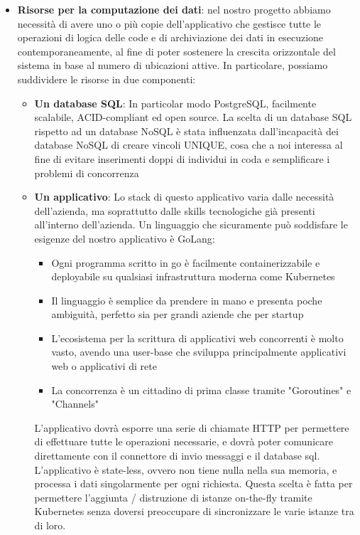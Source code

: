 \documentclass[a4paper, titlepage, 12pt, openright, twoside]{book}
\begin{document}
\begin{itemize}
	\item \textbf{Risorse per la computazione dei dati}: nel nostro progetto abbiamo necessità di avere uno o più copie dell'applicativo che gestisce tutte le operazioni
				 di logica delle code e di archiviazione dei dati in esecuzione contemporaneamente, al fine di poter sostenere la crescita orizzontale del sistema in base al numero di ubicazioni attive. In particolare, possiamo suddividere le risorse in due componenti:
				 \begin{itemize}
				 	\item \textbf{Un database SQL}: In particolar modo PostgreSQL, facilmente scalabile, ACID-compliant ed open source. La scelta di un database SQL rispetto ad
				 				 un database NoSQL è stata influenzata dall'incapacità dei database NoSQL di creare vincoli UNIQUE, cosa che a noi interessa
				 				 al fine di evitare inserimenti doppi di individui in coda e semplificare i problemi di concorrenza
				 	\item \textbf{Un applicativo}: Lo stack di questo applicativo varia dalle necessità dell'azienda, ma soprattutto dalle skills tecnologiche già presenti
				 				 all'interno dell'azienda. Un linguaggio che sicuramente può soddisfare le esigenze del nostro applicativo è GoLang:
				 				 \begin{itemize}
				 				 	\item Ogni programma scritto in go è facilmente containerizzabile e deployabile su qualsiasi infrastruttura moderna come Kubernetes
				 				 	\item Il linguaggio è semplice da prendere in mano e presenta poche ambiguità, perfetto sia per grandi aziende che per startup
				 				 	\item L'ecosistema per la scrittura di applicativi web concorrenti è molto vasto, avendo una user-base che sviluppa principalmente 
				 				 		  applicativi web o applicativi di rete
				 				 	\item La concorrenza è un cittadino di prima classe tramite "Goroutines" e "Channels"
				 				 \end{itemize}
				 				 L'applicativo dovrà esporre una serie di chiamate HTTP per permettere di effettuare tutte le operazioni necessarie,
				 				 e dovrà poter comunicare direttamente con il connettore di invio messaggi e il database sql. L'applicativo è state-less, ovvero non tiene nulla nella sua memoria, e processa i dati singolarmente per ogni richiesta. Questa scelta è fatta per permettere l'aggiunta / distruzione di istanze on-the-fly tramite
				 				 Kubernetes senza doversi preoccupare di sincronizzare le varie istanze tra di loro.
				 \end{itemize}
	

\end{itemize}
\end{document}
